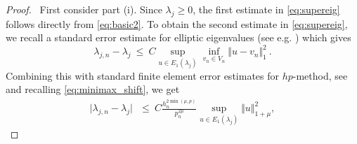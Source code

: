 \documentclass[preprint ,12pt]{elsarticle}
\begin{document}
\begin{proof}\
First consider part (i). 
Since $\lambda_j \geq  0$, the first estimate in 
\eqref{eq:supereig} follows directly from \eqref{eq:basic2}.
 To obtain the second estimate in \eqref{eq:supereig},  
we recall a  standard error  estimate for elliptic eigenvalues   
(see e.g.  \cite[(1.1)]{BaOs:89}) which gives  
$$ \lambda_{j,n} - \lambda_j \ \leq \  C \sup_{u \in
  E_1(\lambda_j)} \inf_{v_n \in V_n} \Vert u - v_n \Vert_1^2\ . $$
Combining this with standard finite element error
estimates for $hp$-method, see \cite[Theorem~4.72]{schwab} and recalling \eqref{eq:minimax_shift}, we get  
\begin{eqnarray}
\vert \lambda_{j,n} - \lambda_j \vert \  \  
\ \leq \ C \frac{h_n^{2\min(\mu,p)} }{p_n^{2\mu}} \sup_{u \in
  E_1(\lambda_j)} \Vert u \Vert_{1+\mu}^2 ,  \label{eq:second_est} \end{eqnarray}


\end{proof}
\end{document}
